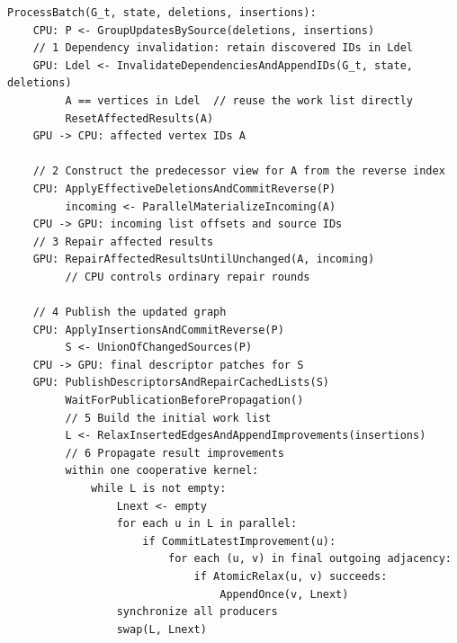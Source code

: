 \begin{lstlisting}[caption={CPU--GPU cooperative processing of an update batch},label={alg:batch}]
ProcessBatch(G_t, state, deletions, insertions):
    CPU: P <- GroupUpdatesBySource(deletions, insertions)
    // 1 Dependency invalidation: retain discovered IDs in Ldel
    GPU: Ldel <- InvalidateDependenciesAndAppendIDs(G_t, state, deletions)
         A == vertices in Ldel  // reuse the work list directly
         ResetAffectedResults(A)
    GPU -> CPU: affected vertex IDs A

    // 2 Construct the predecessor view for A from the reverse index
    CPU: ApplyEffectiveDeletionsAndCommitReverse(P)
         incoming <- ParallelMaterializeIncoming(A)
    CPU -> GPU: incoming list offsets and source IDs
    // 3 Repair affected results
    GPU: RepairAffectedResultsUntilUnchanged(A, incoming)
         // CPU controls ordinary repair rounds

    // 4 Publish the updated graph
    CPU: ApplyInsertionsAndCommitReverse(P)
         S <- UnionOfChangedSources(P)
    CPU -> GPU: final descriptor patches for S
    GPU: PublishDescriptorsAndRepairCachedLists(S)
         WaitForPublicationBeforePropagation()
         // 5 Build the initial work list
         L <- RelaxInsertedEdgesAndAppendImprovements(insertions)
         // 6 Propagate result improvements
         within one cooperative kernel:
             while L is not empty:
                 Lnext <- empty
                 for each u in L in parallel:
                     if CommitLatestImprovement(u):
                         for each (u, v) in final outgoing adjacency:
                             if AtomicRelax(u, v) succeeds:
                                 AppendOnce(v, Lnext)
                 synchronize all producers
                 swap(L, Lnext)
\end{lstlisting}

